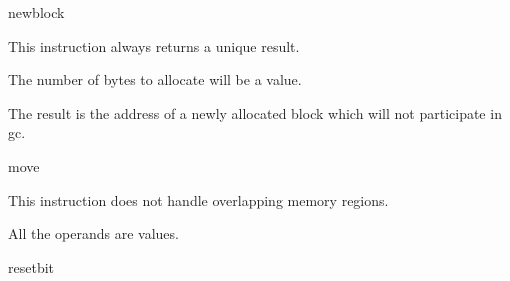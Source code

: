 \begin{instruction}{newblock}

  \begin{notes}
    This instruction always returns a unique result.

    The number of bytes to allocate will be a  value.
  \end{notes}

  \begin{results}
  \item The result is the address of a newly allocated block which
    will not participate in \ac{gc}.
  \end{results}

  \begin{operands}
  \item {}
  \end{operands}
\end{instruction}

\begin{instruction}{move}

  \begin{notes}
    This instruction does not handle overlapping memory regions.

    All the operands are  values.
  \end{notes}

  \nresults

  \begin{operands}
  \item {}
  \item {}
  \item {}
  \end{operands}
\end{instruction}

\begin{instruction}{resetbit}

  \nresults

  \begin{operands}
  \item {}
  \item {}
  \end{operands}
\end{instruction}


